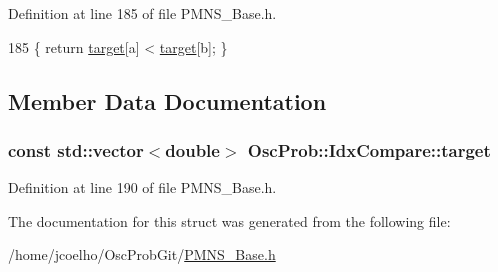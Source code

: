 Definition at line 185 of file P\+M\+N\+S\+\_\+\+Base.\+h.


\begin{DoxyCode}
185 \{ \textcolor{keywordflow}{return} \hyperlink{structOscProb_1_1IdxCompare_ab3258085f0afeb64bf472413bfed43ac}{target}[a] < \hyperlink{structOscProb_1_1IdxCompare_ab3258085f0afeb64bf472413bfed43ac}{target}[b]; \}
\end{DoxyCode}


\subsection{Member Data Documentation}
\subsubsection[{\texorpdfstring{target}{target}}]{\setlength{\rightskip}{0pt plus 5cm}const std\+::vector$<$double$>$ Osc\+Prob\+::\+Idx\+Compare\+::target\hspace{0.3cm}{\ttfamily [private]}}\hypertarget{structOscProb_1_1IdxCompare_ab3258085f0afeb64bf472413bfed43ac}{}\label{structOscProb_1_1IdxCompare_ab3258085f0afeb64bf472413bfed43ac}


Definition at line 190 of file P\+M\+N\+S\+\_\+\+Base.\+h.



The documentation for this struct was generated from the following file\+:\begin{DoxyCompactItemize}
\item 
/home/jcoelho/\+Osc\+Prob\+Git/\hyperlink{PMNS__Base_8h}{P\+M\+N\+S\+\_\+\+Base.\+h}\end{DoxyCompactItemize}
